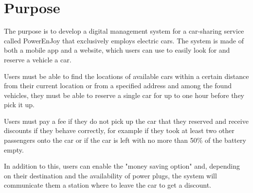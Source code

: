 \section{Purpose}
The purpose is to develop a digital management system for a car-sharing service called PowerEnJoy that exclusively employs electric cars. The system is made of both a mobile app and a website, which users can use to easily look for and reserve a vehicle a car.

Users must be able to find the locations of available cars within a certain distance from their current location or from a specified address and among the found vehicles, they must be able to reserve a single car for up to one hour before they pick it up.

Users must pay a fee if they do not pick up the car that they reserved and receive discounts if they behave correctly, for example if they took at least two other passengers onto the car or if the car is left with no more than 50\% of the battery empty.

In addition to this, users can enable the "money saving option" and, depending on their destination and the availability of power plugs, the system will communicate them a station where to leave the car to get a discount.
